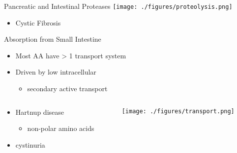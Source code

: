 \documentclass[presentation, smaller]{beamer}
\begin{document}
\begin{frame}[label={sec:orgheadline3}]{Pancreatic and Intestinal Proteases}
\centering
\texttt{[image: ./figures/proteolysis.png]}

\begin{itemize}
\item Cystic Fibrosis
\end{itemize}
\end{frame}
\begin{frame}[label={sec:orgheadline4}]{Absorption from Small Intestine}
\begin{itemize}
\item Most AA have \textgreater{} 1 transport system
\item Driven by low intracellular 
\begin{itemize}
\item secondary active transport
\end{itemize}
\end{itemize}

\begin{columns}
\begin{column}{0.5\columnwidth}
\begin{itemize}
\item Hartnup disease
\begin{itemize}
\item non-polar amino acids
\end{itemize}
\item cystinuria
\end{itemize}
\end{column}


\begin{column}{0.5\columnwidth}
\texttt{[image: ./figures/transport.png]}
\end{column}
\end{columns}
\end{frame}
\end{document}
